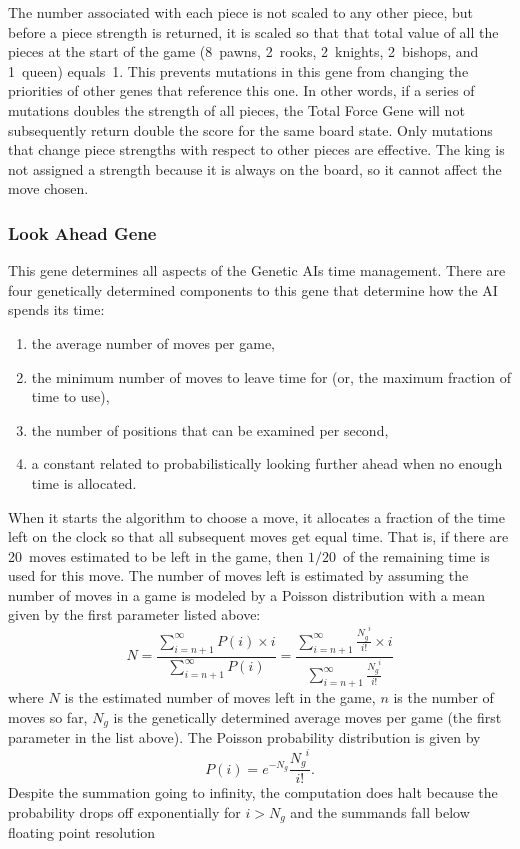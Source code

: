 \documentclass[letterpaper]{article}
\renewcommand\_{\textunderscore\allowbreak}
\begin{document}
The number associated with each piece is not scaled to any other piece, but before a piece strength is returned, it is scaled so that that total value of all the pieces at the start of the game (8~pawns, 2~rooks, 2~knights, 2~bishops, and 1~queen) equals~1. This prevents mutations in this gene from changing the priorities of other genes that reference this one. In other words, if a series of mutations doubles the strength of all pieces, the Total Force Gene will not subsequently return double the score for the same board state. Only mutations that change piece strengths with respect to other pieces are effective. The king is not assigned a strength because it is always on the board, so it cannot affect the move chosen.

\subsubsection{Look Ahead Gene}
This gene determines all aspects of the Genetic AIs time management. There are four genetically determined components to this gene that determine how the AI spends its time:
\begin{enumerate}
	\item the average number of moves per game,
	\item the minimum number of moves to leave time for (or, the maximum fraction of time to use),
	\item the number of positions that can be examined per second,
	\item a constant related to probabilistically looking further ahead when no enough time is allocated.
\end{enumerate}
When it starts the algorithm to choose a move, it allocates a fraction of the time left on the clock so that all subsequent moves get equal time. That is, if there are 20~moves estimated to be left in the game, then \(1/20\)~of the remaining time is used for this move. The number of moves left is estimated by assuming the number of moves in a game is modeled by a Poisson distribution with a mean given by the first parameter listed above:
\[N = \frac{\sum_{i = n + 1}^\infty P(i)\times{}i}{\sum_{i = n + 1}^\infty P(i)} = \frac{\sum_{i = n + 1}^\infty \frac{N_g^{\phantom{g}i}}{i!}\times{}i}{\sum_{i = n + 1}^\infty \frac{N_g^{\phantom{g}i}}{i!}}\]
where \(N\) is the estimated number of moves left in the game, \(n\) is the number of moves so far, \(N_g\) is the genetically determined average moves per game (the first parameter in the list above). The Poisson probability distribution is given by
\[P(i) = e^{-N_g}\frac{N_g^{\phantom{g}i}}{i!}.\]
Despite the summation going to infinity, the computation does halt because the probability drops off exponentially for \(i > N_g\) and the summands fall below floating point resolution
\end{document}
